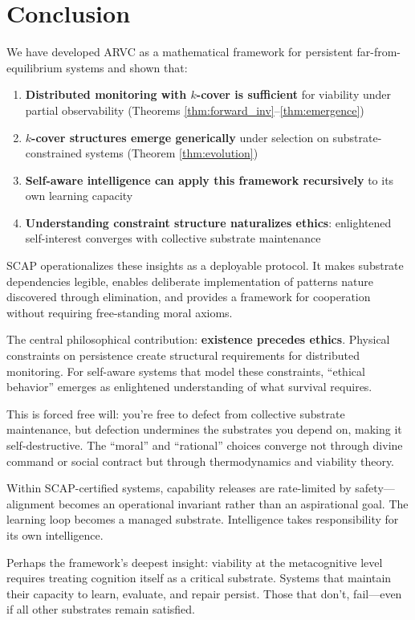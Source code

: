 \documentclass[11pt,a4paper]{article}
\theoremstyle{definition}
\begin{document}
\section{Conclusion}

We have developed ARVC as a mathematical framework for persistent far-from-equilibrium systems and shown that:

\begin{enumerate}
\item \textbf{Distributed monitoring with $k$-cover is sufficient} for viability under partial observability (Theorems \ref{thm:forward_inv}--\ref{thm:emergence})
\item \textbf{$k$-cover structures emerge generically} under selection on substrate-constrained systems (Theorem \ref{thm:evolution})
\item \textbf{Self-aware intelligence can apply this framework recursively} to its own learning capacity
\item \textbf{Understanding constraint structure naturalizes ethics}: enlightened self-interest converges with collective substrate maintenance
\end{enumerate}

SCAP operationalizes these insights as a deployable protocol. It makes substrate dependencies legible, enables deliberate implementation of patterns nature discovered through elimination, and provides a framework for cooperation without requiring free-standing moral axioms.

The central philosophical contribution: \textbf{existence precedes ethics}. Physical constraints on persistence create structural requirements for distributed monitoring. For self-aware systems that model these constraints, ``ethical behavior'' emerges as enlightened understanding of what survival requires.

This is forced free will: you're free to defect from collective substrate maintenance, but defection undermines the substrates you depend on, making it self-destructive. The ``moral'' and ``rational'' choices converge not through divine command or social contract but through thermodynamics and viability theory.

Within SCAP-certified systems, capability releases are rate-limited by safety---alignment becomes an operational invariant rather than an aspirational goal. The learning loop becomes a managed substrate. Intelligence takes responsibility for its own intelligence.

Perhaps the framework's deepest insight: viability at the metacognitive level requires treating cognition itself as a critical substrate. Systems that maintain their capacity to learn, evaluate, and repair persist. Those that don't, fail---even if all other substrates remain satisfied.
\end{document}
